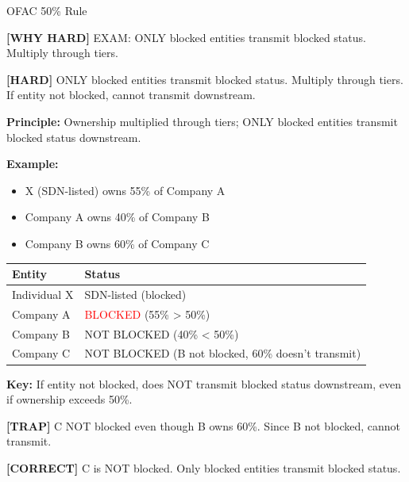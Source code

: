 \documentclass[6pt,aspectratio=169,fontsize=5pt]{beamer}
\renewcommand{\tiny}{\fontsize{3.5pt}{4.5pt}\selectfont}
\renewcommand{\normalsize}{\fontsize{7.5pt}{8.5pt}\selectfont}
\newcommand{\trap}[1]{%
	\begin{block}{\textcolor{redtrap}{\textbf{[TRAP]}}}
		\textcolor{redtrap}{\tiny #1}
	\end{block}
}
\newcommand{\correct}[1]{%
	\begin{block}{\textcolor{greencorrect}{\textbf{[CORRECT]}}}
		\textcolor{greencorrect}{\tiny #1}
	\end{block}
}
\newcommand{\hard}[1]{%
	\begin{block}{\textcolor{hardcolor}{\textbf{[HARD]}}}
		\textcolor{hardcolor}{\tiny #1}
	\end{block}
}
\newcommand{\hardexplain}[1]{%
	\begin{block}{\textcolor{orangehard}{\textbf{[WHY HARD]}}}
		\textcolor{orangehard}{\tiny #1}
	\end{block}
}
\begin{document}
	\begin{frame}{\normalsize OFAC 50\% Rule}
		
		\hardexplain{EXAM: ONLY blocked entities transmit blocked status. Multiply through tiers.}
		
		\hard{ONLY blocked entities transmit blocked status. Multiply through tiers. If entity not blocked, cannot transmit downstream.}
		
		\textbf{Principle:} Ownership multiplied through tiers; ONLY blocked entities transmit blocked status downstream.
		
		\textbf{Example:}
		\begin{itemize}
			\item X (SDN-listed) owns 55\% of Company A
			\item Company A owns 40\% of Company B
			\item Company B owns 60\% of Company C
		\end{itemize}
		
		\begin{table}
			\begin{tabular}{|p{2.5cm}|p{4.5cm}|}
				\hline
				\textbf{Entity} & \textbf{Status} \\
				\hline
				Individual X & SDN-listed (blocked) \\
				\hline
				Company A & \textcolor{red}{BLOCKED} (55\% > 50\%) \\
				\hline
				Company B & NOT BLOCKED (40\% < 50\%) \\
				\hline
				Company C & NOT BLOCKED (B not blocked, 60\% doesn't transmit) \\
				\hline
			\end{tabular}
		\end{table}
		
		\textbf{Key:} If entity not blocked, does NOT transmit blocked status downstream, even if ownership exceeds 50\%.
		
		\trap{C NOT blocked even though B owns 60\%. Since B not blocked, cannot transmit.}
		
		\correct{C is NOT blocked. Only blocked entities transmit blocked status.}
	\end{frame}
	
\end{document}
